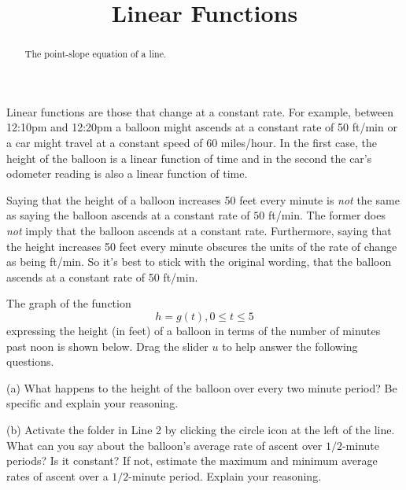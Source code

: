 \documentclass{ximera}
\title{Linear Functions}
\begin{document}
\begin{abstract}
The point-slope equation of a line.
\end{abstract}
\maketitle

Linear functions are those that change at a constant rate. For example, between 12:10pm and 12:20pm a balloon might ascends at a constant rate of 50 ft/min or a car might travel at a constant speed of 60 miles/hour. In the first case, the height of the balloon is a linear function of time and in the second the car's odometer reading is also a linear function of time.

Saying that the height of a balloon increases 50 feet every minute is \emph{not} the same as saying the balloon ascends at a constant rate of $50$ ft/min. The former does \emph{not} imply that the balloon ascends at a constant rate. Furthermore, saying that the height increases 50 feet every minute obscures the units of the rate of change as being ft/min. So it's best to stick with the original wording, that the balloon ascends at a constant rate of 50 ft/min.


\begin{question}  \label{Q343rfgg}
The graph of the function
\[
    h = g(t) , 0\leq t \leq 5
\]
expressing the height (in feet) of a balloon in terms of the number of minutes past noon is shown below. Drag the slider $u$ to help answer the following questions.

\begin{freeResponse}
(a) What happens to  the height of the balloon over every two minute period? Be specific and explain your reasoning.

(b) Activate the folder in Line 2 by clicking the circle icon at the left of the line. What can you say about the balloon's average rate of ascent over $1/2$-minute periods? Is it constant? If not, estimate the maximum and minimum average rates of ascent over a $1/2$-minute period. Explain your reasoning.
\end{freeResponse}

 
\begin{onlineOnly}
    \begin{center}
\end{center}
\end{onlineOnly}

\end{question}
\end{document}
